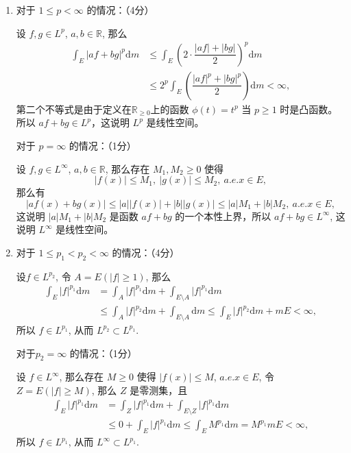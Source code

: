 \begin{solution}
  \begin{enumerate}
    \item 对于 \(1 \leqslant p < \infty\) 的情况：（4分）

    设 \(f, g \in L^p\), \(a, b \in \mathbb{R}\), 那么
    \[\begin{aligned}
    \int_E \lvert af + bg \rvert^p \mathrm{d} m & \leqslant \int_E \left( 2 \cdot \dfrac{\lvert af \rvert + \lvert bg \rvert}{2} \right)^p \mathrm{d} m \\
    & \leqslant 2^p \int_E \left( \dfrac{\lvert af \rvert^p + \lvert bg \rvert^p}{2} \right) \mathrm{d} m < \infty,
    \end{aligned}\]
    第二个不等式是由于定义在\(\mathbb{R}_{\geqslant 0}\)上的函数 \(\phi(t) = t^p\) 当 \(p \geqslant 1\) 时是凸函数。所以 \(af + bg \in L^p\)，这说明 \(L^p\) 是线性空间。

    对于 \(p = \infty\) 的情况：（1分）

    设 \(f, g \in L^\infty\), \(a, b \in \mathbb{R}\), 那么存在 \(M_1, M_2 \geqslant 0\) 使得
    \[\lvert f(x) \rvert \leqslant M_1, ~ \lvert g(x) \rvert \leqslant M_2, ~ a.e. x \in E,\]
    那么有
    \[\lvert af(x) + bg(x) \rvert \leqslant \lvert a \rvert \lvert f(x) \rvert + \lvert b \rvert \lvert g(x) \rvert \leqslant \lvert a \rvert M_1 + \lvert b \rvert M_2, ~ a.e. x \in E,\]
    这说明 \(\lvert a \rvert M_1 + \lvert b \rvert M_2\) 是函数 \(af + bg\) 的一个本性上界，所以 \(af + bg \in L^\infty\), 这说明 \(L^\infty\) 是线性空间。
    \item 对于 \(1 \leqslant p_1 < p_2 < \infty\) 的情况：（4分）

    设\(f \in L^{p_2}\), 令 \(A = E(\lvert f \rvert \geqslant 1)\), 那么
    \[\begin{aligned}
    \int_E \lvert f \rvert^{p_1} \mathrm{d} m & = \int_A \lvert f \rvert^{p_1} \mathrm{d} m + \int_{E \setminus A} \lvert f \rvert^{p_1} \mathrm{d} m \\
    & \leqslant \int_A \lvert f \rvert^{p_2} \mathrm{d} m + \int_{E \setminus A} \mathrm{d} m \leqslant \int_E \lvert f \rvert^{p_2} \mathrm{d} m + m E < \infty,
    \end{aligned}\]
    所以 \(f \in L^{p_1}\), 从而 \(L^{p_2} \subset L^{p_1}\).

    对于\(p_2 = \infty\) 的情况：（1分）

    设 \(f \in L^\infty\), 那么存在 \(M \geqslant 0\) 使得 \(\lvert f(x) \rvert \leqslant M\), \(a.e. x \in E\), 令 \(Z = E(\lvert f \rvert \geqslant M)\), 那么 \(Z\) 是零测集，且
    \[\begin{aligned}
    \int_E \lvert f \rvert^{p_1} \mathrm{d} m & = \int_Z \lvert f \rvert^{p_1} \mathrm{d} m + \int_{E \setminus Z} \lvert f \rvert^{p_1} \mathrm{d} m \\
    & \leqslant 0 + \int_E \lvert f \rvert^{p_1} \mathrm{d} m \leqslant \int_E M^{p_1} \mathrm{d} m = M^{p_1} m E < \infty,
    \end{aligned}\]
    所以 \(f \in L^{p_1}\), 从而 \(L^\infty \subset L^{p_1}\).
  \end{enumerate}
\end{solution}

